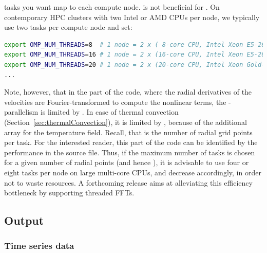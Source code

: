 \documentclass[a4paper, 11pt, DIV=11]{scrartcl}
\begin{document}
tasks you want map to each compute node. \hyperthreading is not beneficial for
\nsc. On contemporary HPC clusters with two Intel or AMD CPUs per node, we typically use two
\mpi tasks per compute node and set:
\begin{lstlisting}[language=bash]
export OMP_NUM_THREADS=8  # 1 node = 2 x ( 8-core CPU, Intel Xeon E5-2670, SandyBridge)
export OMP_NUM_THREADS=16 # 1 node = 2 x (16-core CPU, Intel Xeon E5-2698v3, Haswell)
export OMP_NUM_THREADS=20 # 1 node = 2 x (20-core CPU, Intel Xeon Gold-6148, Skylake)
...
\end{lstlisting}
Note, however, that in the part of the code, where the radial derivatives of the velocities are
Fourier-transformed to compute the nonlinear terms, the \omp-parallelism is limited by
. In case of thermal convection (Section~\ref{sec:thermalConvection}), it is
limited by , because of the additional array for the temperature field. Recall,
that  is the number of radial grid points per \mpi task. For the interested reader,
this part of the code can be identified by the performance  in the
 source file. Thus, if the maximum number of \mpi tasks is chosen for a
given number of radial points (and hence ), it is advisable to use four or eight
\mpi tasks per node on large multi-core CPUs, and decrease 
accordingly, in order not to waste resources. A forthcoming release aims at alleviating this
efficiency bottleneck by supporting threaded FFTs.


\subsection{Output}
\label{sec:output}

\subsubsection{Time series data}
\label{sec:timeSeries}
\end{document}
